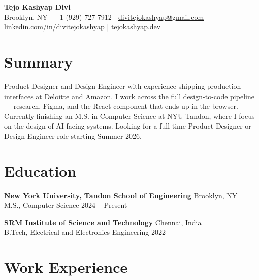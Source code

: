 \documentclass[11pt, letterpaper]{article}
\begin{document}

\begin{center}
  {\LARGE \textbf{Tejo Kashyap Divi}}\\[5pt]
  Brooklyn, NY \quad|\quad
  +1 (929) 727-7912 \quad|\quad
  \href{mailto:divitejokashyap@gmail.com}{divitejokashyap@gmail.com}\\[2pt]
  \href{https://www.linkedin.com/in/divitejokashyap}{linkedin.com/in/divitejokashyap}
  \quad|\quad
  \href{https://tejokashyap.dev}{tejokashyap.dev}
\end{center}

\section{Summary}

Product Designer and Design Engineer with experience shipping production
interfaces at Deloitte and Amazon. I work across the full design-to-code
pipeline — research, Figma, and the React component that ends up in the
browser. Currently finishing an M.S. in Computer Science at NYU Tandon,
where I focus on the design of AI-facing systems. Looking for a full-time
Product Designer or Design Engineer role starting Summer 2026.

\section{Education}

\textbf{New York University, Tandon School of Engineering} \hfill Brooklyn, NY\\
M.S., Computer Science \hfill 2024 -- Present

\vspace{5pt}
\textbf{SRM Institute of Science and Technology} \hfill Chennai, India\\
B.Tech, Electrical and Electronics Engineering \hfill 2022

\section{Work Experience}
\end{document}
